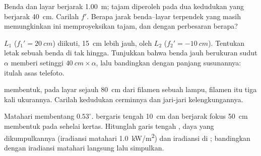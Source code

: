 \begin{exercise}[$\star\star$]\label{exo:b1:mirrors-thin-lenses:9}
Benda dan layar berjarak \qty{1.00}{m};  tajam diperoleh pada
dua kedudukan  yang berjarak \qty{40}{cm}. Carilah $f'$. Berapa
jarak benda--layar terpendek yang masih memungkinkan  ini
memproyeksikan  tajam, dan dengan perbesaran berapa?
\end{exercise}

\begin{exercise}[$\star\star\star$]\label{exo:b1:mirrors-thin-lenses:10}
 $L_1$ ($f_1' = \qty{20}{cm}$) diikuti, \qty{15}{cm}
lebih jauh, oleh  $L_2$ ($f_2' = \qty{-10}{cm}$).
Tentukan letak  sebuah benda di tak hingga. Tunjukkan bahwa
benda jauh berukuran sudut $\alpha$ memberi  setinggi
$\qty{40}{cm}\times\alpha$, lalu bandingkan dengan panjang susunannya:
itulah asas  telefoto.
\end{exercise}

\begin{exercise}[$\star\star\star$]\label{exo:b1:mirrors-thin-lenses:11}
 membentuk, pada layar sejauh \qty{80}{cm} dari filamen
sebuah lampu,  filamen itu tiga kali ukurannya. Carilah
kedudukan cerminnya dan jari-jari kelengkungannya.
\end{exercise}

\begin{exercise}[$\star\star\star$]\label{exo:b1:mirrors-thin-lenses:12}
Matahari membentang $0.53^\circ$.  bergaris tengah
\qty{10}{cm} dan berjarak fokus \qty{50}{cm} membentuk  pada
sehelai kertas. Hitunglah garis tengah , daya yang
dikumpulkannya (iradiansi matahari \qty{1.0}{kW/m^2}) dan iradiansi di
; bandingkan dengan iradiansi matahari langsung lalu simpulkan.
\end{exercise}

